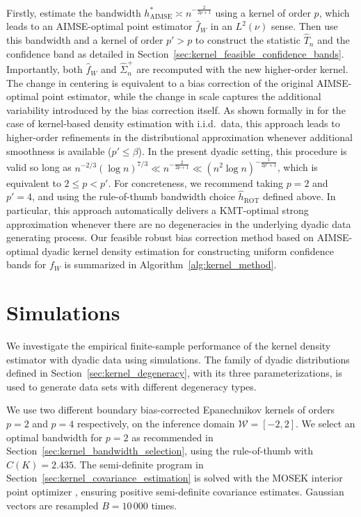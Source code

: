 \documentclass[11pt,lof]{puthesis}
\newcommand{\cW}{\ensuremath{\mathcal{W}}}
\DeclareMathOperator{\AIMSE}{AIMSE}
\DeclareMathOperator{\ROT}{ROT}
\theoremstyle{break}
\theoremstyle{proof}
\begin{document}
Firstly, estimate the bandwidth $h^*_{\AIMSE}\asymp n^{-\frac{2}{2p+1}}$ using a
kernel of order $p$, which leads to an AIMSE-optimal point estimator
$\hat{f}_W$ in an $L^2(\nu)$ sense. Then use this bandwidth and a kernel of
order $p' > p$ to construct the statistic $\hat T_n$ and the confidence band as
detailed in Section~\ref{sec:kernel_feasible_confidence_bands}. Importantly,
both
$\hat{f}_W$ and $\hat{\Sigma}^+_n$ are recomputed with the new higher-order
kernel. The change in centering is equivalent to a bias correction of the
original AIMSE-optimal point estimator, while the change in scale captures the
additional variability introduced by the bias correction itself. As shown
formally in \citet{calonico2018effect, calonico2022coverage} for the case of
kernel-based density
estimation with i.i.d.\ data, this approach leads to higher-order refinements
in the distributional approximation whenever additional smoothness is available
($p'\leq\beta$). In the present dyadic setting, this procedure is valid so long
as $n^{-2/3} (\log n)^{7/3} \ll n^{-\frac{2}{2p+1}}
\ll (n^2 \log n)^{-\frac{1}{2p' + 1}}$,
which is equivalent to $2 \leq p < p'$.
For concreteness, we recommend taking $p = 2$ and $p' = 4$,
and using the rule-of-thumb bandwidth choice $\hat{h}_{\ROT}$ defined above.
In particular, this approach automatically delivers a KMT-optimal
strong approximation whenever there are no degeneracies in the
underlying dyadic data generating process.
Our feasible robust bias correction method based on AIMSE-optimal dyadic
kernel density estimation for constructing uniform confidence bands
for $f_W$ is summarized in Algorithm~\ref{alg:kernel_method}.

\section{Simulations}
\label{sec:kernel_simulations}

We investigate the empirical finite-sample performance of the kernel density
estimator with dyadic data using simulations. The family of dyadic
distributions defined in Section~\ref{sec:kernel_degeneracy}, with its three
parameterizations, is used to generate data sets with different degeneracy
types.

We use two different boundary bias-corrected Epanechnikov kernels of orders
$p=2$ and $p=4$ respectively, on the inference domain $\cW = [-2,2]$. We select
an optimal bandwidth for $p=2$ as recommended in
Section~\ref{sec:kernel_bandwidth_selection}, using the rule-of-thumb with
$C(K) = 2.435$. The semi-definite program in
Section~\ref{sec:kernel_covariance_estimation} is solved with the MOSEK
interior point
optimizer \citep{mosek}, ensuring positive semi-definite covariance estimates.
Gaussian vectors are resampled $B = 10\,000$ times.
\end{document}
